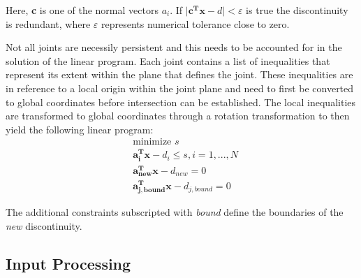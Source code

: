 Here, \textbf{c} is one of the normal vectors $a_{i}$. If $\vert \boldsymbol{c^{T} x} - d \vert < \varepsilon$ is true the discontinuity is redundant, where $\varepsilon$ represents numerical tolerance close to zero. \par

Not all joints are necessily persistent and this needs to be accounted for in the solution of the linear program. Each joint contains a list of inequalities that represent its extent within the plane that defines the joint. These inequalities are in reference to a local origin within the joint plane and need to first be converted to global coordinates before intersection can be established. The local inequalities are transformed to global coordinates through a rotation transformation to then yield the following linear program: 
\begin{equation}
\begin{aligned} 
&\text{minimize } s\\
&\boldsymbol{a_{i}^{T} x} - d_i \leq s, i = 1,...,N\\
&\boldsymbol{a_{new}^{T} x} - d_{new} = 0\\
&\boldsymbol{a_{j,bound}^{T} x} - d_{j,bound} = 0
\end{aligned}
\end{equation}

The additional constraints subscripted with \textit{bound} define the boundaries of the \textit{new} discontinuity. 



\subsection{Input Processing}
